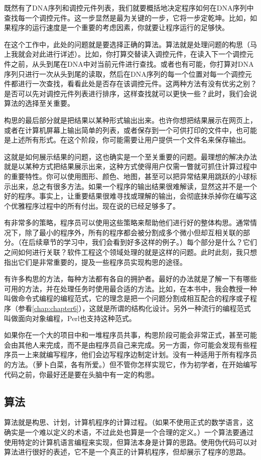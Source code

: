 既然有了DNA序列和调控元件列表，我们就要概括地决定程序如何在DNA序列中查找每一个调控元件。这一步显然是最为关键的一步，它将一步定乾坤。比如，如果程序的运行速度是一个重要的考虑因素，你就要让程序运行的足够快。

在这个工作中，此处的问题就是要选择正确的算法。算法就是处理问题的构思（马上我就会对此进行详述）。比如，你打算交替读入调控元件，在读入下一个调控元件之前，从头到尾在DNA中对当前元件进行查找。或者也有可能，你打算对DNA序列只进行一次从头到尾的读取，然后在DNA序列的每一个位置对每一个调控元件都进行一次查找，看看此处是否存在该调控元件。这两种方法有没有优劣之别？是否可以先对调控元件列表进行排序，这样查找就可以更快一些？此时，我们会说算法的选择至关重要。

构思的最后部分就是把结果以某种形式输出出来。也许你想把结果展示在网页上，或者在计算机屏幕上输出简单的列表，或者保存到一个可供打印的文件中，也可能是上述所有形式。在这个阶段，你可能需要让用户提供一个文件名来保存输出。

这就是如何展示结果的问题，这也确实是一个至关重要的问题。最理想的解决办法就是以某种方式把结果展示出来，这种方式使得用户仅需一瞥就可抓住计算过程中的重要特性。你可以使用图形、颜色、地图，甚至可以把异常结果用跳跃的小球标示出来，总之有很多方法。如果一个程序的输出结果很难解读，显然这并不是一个好的程序。事实上，让重要结果很难寻找或理解的输出，会彻底抹杀掉你在编写这个优雅程序过程中的所有付出。现在说的已经足够多了。

有非常多的策略，程序员可以使用这些策略来帮助他们进行好的整体构思。通常情况下，除了最小的程序外，所有的程序都会被分割成多个微小但却互相关联的部分。（在后续章节的学习中，我们会看到好多这样的例子。）每个部分是什么？它们之间如何进行关联？软件工程这个领域处理的就是这样的问题。此时此刻，我只想指出它们是非常重要的，提及一些程序员实现构思的途径。

有许多构思的方法，每种方法都有各自的拥护者。最好的办法就是了解一下有哪些可用的方法，并在处理任务时使用最合适的方法。比如，在本书中，我会教授一种叫做命令式编程的编程范式，它的理念是把一个问题分割成相互配合的程序或子程序（参看\ref{chap:chapter6}），这就是所谓的结构化设计。另外一种流行的编程范式叫做面向对象编程，Perl也支持这种范式。

如果你在一个大的项目中和一堆程序员共事，构思阶段可能会非常正式，甚至可能会由其他人来完成，而不是由程序员自己来完成。另一方面，你可能会发现有些程序员一上来就编写程序，他们会边写程序边制定计划。没有一种适用于所有程序员的方法。（萝卜白菜，各有所爱。）但不管你怎样实现它，作为初学者，在开始编写代码之前，你最好还是要在头脑中有一定的构思。

\subsection{算法}
算法就是构思、计划，计算机程序的计算过程。（如果不使用正式的数学语言，这确实是一个难以定义的术语，不过此处也算是一个合理的定义。）一个算法要通过使用特定的计算机语言编程来实现，但算法本身是计算的思路。使用伪代码可以对算法进行很好的表述，它不是一个真正的计算机程序，但却展示了程序的思路。

